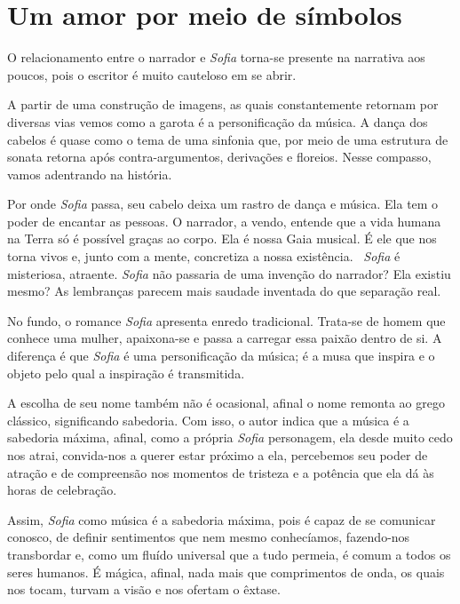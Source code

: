 \documentclass[12pt]{extarticle}
\begin{document}
\tableofcontents

\section{Um amor por meio de símbolos}

O relacionamento entre o narrador e \textit{Sofia} torna-se
presente na narrativa aos poucos, pois o escritor é muito cauteloso em se
abrir.  

A partir de uma construção de imagens, as quais constantemente retornam
por diversas vias vemos como a garota é a personificação da música. A dança dos
cabelos é quase como o tema de uma sinfonia que, por meio de uma estrutura de
sonata retorna após contra-argumentos, derivações e floreios. Nesse compasso,
vamos adentrando na história.  

Por onde \textit{Sofia} passa, seu cabelo deixa um rastro
de dança e música. Ela tem o poder de encantar as pessoas. O narrador, a vendo,
entende que a vida humana na Terra só é possível graças ao corpo. Ela é nossa
Gaia musical. É ele que nos torna vivos e, junto com a mente, concretiza a
nossa existência.  \textit{Sofia} é misteriosa, atraente. \textit{Sofia} não passaria de uma
invenção do narrador? Ela existiu mesmo? As lembranças parecem mais saudade
inventada do que separação real.  

No fundo, o romance \textit{Sofia} apresenta enredo
tradicional. Trata-se de homem que conhece uma mulher, apaixona-se e passa a
carregar essa paixão dentro de si. A diferença é que \textit{Sofia} é uma personificação
da música; é a musa que inspira e o objeto pelo qual a inspiração é
transmitida.  

A escolha de seu nome também não é ocasional, afinal o nome
remonta ao grego clássico, significando sabedoria. Com isso, o autor indica que
a música é a sabedoria máxima, afinal, como a própria \textit{Sofia} personagem, ela
desde muito cedo nos atrai, convida-nos a querer estar próximo a ela,
percebemos seu poder de atração e de compreensão nos momentos de tristeza e a
potência que ela dá às horas de celebração.  

Assim, \textit{Sofia} como música é a
sabedoria máxima, pois é capaz de se comunicar conosco, de definir sentimentos
que nem mesmo conhecíamos, fazendo-nos transbordar e, como um fluído universal
que a tudo permeia, é comum a todos os seres humanos. É mágica, afinal, nada
mais que comprimentos de onda, os quais nos tocam, turvam a visão e nos ofertam
o êxtase.  
\end{document}
